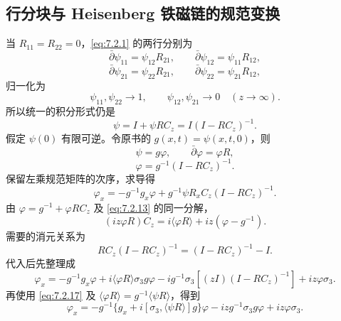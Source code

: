 \documentclass[lang=cn,scheme=chinese,mode=simple,device=normal,color=blue,math=cm,thmcnt=section,12pt]{elegantbook}
\newcommand{\eqq}[2]{\tag{#1}\label{eq:#1}#2}
\begin{document}
\subsection{行分块与 Heisenberg 铁磁链的规范变换}
当 $R_{11}=R_{22}=0$，\eqref{eq:7.2.1} 的两行分别为
\begin{equation}
\eqq{7.2.74}{\bar\partial\psi_{11}=\psi_{12}R_{21},\qquad \bar\partial\psi_{12}=\psi_{11}R_{12},}
\end{equation}
\begin{equation}
\eqq{7.2.75}{\bar\partial\psi_{21}=\psi_{22}R_{21},\qquad \bar\partial\psi_{22}=\psi_{21}R_{12},}
\end{equation}
归一化为
\begin{equation}
\eqq{7.2.76}{\psi_{11},\psi_{22}\to1,\qquad \psi_{12},\psi_{21}\to0\quad(z\to\infty).}
\end{equation}
所以统一的积分形式仍是
\begin{equation}
\eqq{7.2.77}{\psi=I+\psi RC_z=I(I-RC_z)^{-1}.}
\end{equation}
假定 $\psi(0)$ 有限可逆。令原书的 $g(x,t)=\psi(x,t,0)$，则
\begin{equation}
\eqq{7.2.78}{\psi=g\varphi,\qquad \bar\partial\varphi=\varphi R,}
\end{equation}
\begin{equation}
\eqq{7.2.79}{\varphi=g^{-1}(I-RC_z)^{-1}.}
\end{equation}
保留左乘规范矩阵的次序，求导得
\begin{equation}
\eqq{7.2.80}{\varphi_x=-g^{-1}g_x\varphi+g^{-1}\psi R_xC_z(I-RC_z)^{-1}.}
\end{equation}
由 $\varphi=g^{-1}+\varphi RC_z$ 及 \eqref{eq:7.2.13} 的同一分解，
\begin{equation}
\eqq{7.2.81}{(iz\varphi R)C_z=i\langle\varphi R\rangle+iz(\varphi-g^{-1}).}
\end{equation}
需要的消元关系为
\begin{equation}
\eqq{7.2.82}{RC_z(I-RC_z)^{-1}=(I-RC_z)^{-1}-I.}
\end{equation}
代入后先整理成
\begin{equation}
\eqq{7.2.83}{\varphi_x=-g^{-1}g_x\varphi+i\langle\varphi R\rangle\sigma_3g\varphi
-ig^{-1}\sigma_3[(zI)(I-RC_z)^{-1}]+iz\varphi\sigma_3.}
\end{equation}
再使用 \eqref{eq:7.2.17} 及 $\langle\varphi R\rangle=g^{-1}\langle\psi R\rangle$，得到
\begin{equation}
\eqq{7.2.84}{\varphi_x=-g^{-1}\{g_x+i[\sigma_3,\langle\psi R\rangle]g\}\varphi
-izg^{-1}\sigma_3g\varphi+iz\varphi\sigma_3.}
\end{equation}
\end{document}
